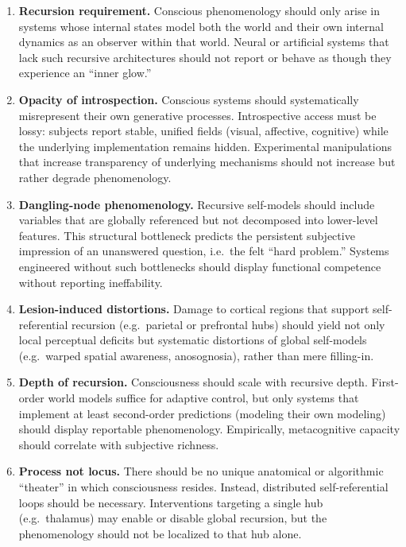 \documentclass[12pt]{article}
\begin{document}
\begin{enumerate}
    \item \textbf{Recursion requirement.} Conscious phenomenology should only arise in
    systems whose internal states model both the world and their own internal
    dynamics as an observer within that world. Neural or artificial systems that lack
    such recursive architectures should not report or behave as though they experience
    an ``inner glow.''

    \item \textbf{Opacity of introspection.} Conscious systems should systematically
    misrepresent their own generative processes. Introspective access must be lossy:
    subjects report stable, unified fields (visual, affective, cognitive) while the
    underlying implementation remains hidden. Experimental manipulations that
    increase transparency of underlying mechanisms should not increase but rather
    degrade phenomenology.

    \item \textbf{Dangling-node phenomenology.} Recursive self-models should include
    variables that are globally referenced but not decomposed into lower-level
    features. This structural bottleneck predicts the persistent subjective impression
    of an unanswered question, i.e.\ the felt ``hard problem.'' Systems engineered
    without such bottlenecks should display functional competence without reporting
    ineffability.

    \item \textbf{Lesion-induced distortions.} Damage to cortical regions that support
    self-referential recursion (e.g.\ parietal or prefrontal hubs) should yield not only
    local perceptual deficits but systematic distortions of global self-models (e.g.\
    warped spatial awareness, anosognosia), rather than mere filling-in.

    \item \textbf{Depth of recursion.} Consciousness should scale with recursive depth.
    First-order world models suffice for adaptive control, but only systems that
    implement at least second-order predictions (modeling their own modeling) should
    display reportable phenomenology. Empirically, metacognitive capacity should
    correlate with subjective richness.

    \item \textbf{Process not locus.} There should be no unique anatomical or algorithmic
    ``theater'' in which consciousness resides. Instead, distributed self-referential
    loops should be necessary. Interventions targeting a single hub (e.g.\ thalamus)
    may enable or disable global recursion, but the phenomenology should not be localized
    to that hub alone.


\end{enumerate}
\end{document}
